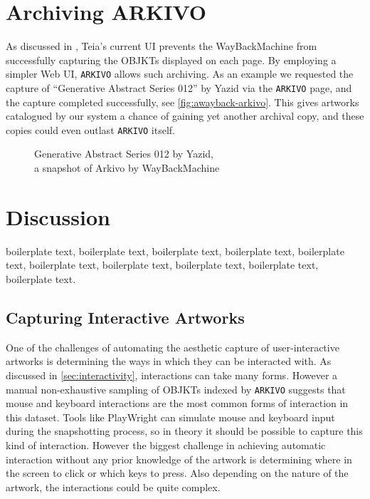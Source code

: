 \todo


\section{Archiving ARKIVO}

As discussed in \todo, Teia's current UI prevents the WayBackMachine from successfully capturing the OBJKTs displayed on each page. By employing a simpler Web UI, \texttt{ARKIVO} allows such archiving. As an example we requested the capture of ``Generative Abstract Series 012'' by Yazid via the \texttt{ARKIVO} page, and the capture completed successfully, see \autoref{fig:awayback-arkivo}. This gives artworks catalogued by our system a chance of gaining yet another archival copy, and these copies could even outlast \texttt{ARKIVO} itself.


\begin{figure}[h]
    \centering
    \captionsetup{justification=centering}
    \begingroup
    \setlength{\fboxsep}{0pt} %
    \setlength{\fboxrule}{1pt} %
    \endgroup
    \caption[WayBackMachine snapshots Arkivo]{Generative Abstract Series 012 by Yazid, \\ a snapshot of Arkivo by WayBackMachine}
    \label{fig:awayback-arkivo}
\end{figure}


\section{Discussion}


boilerplate text, boilerplate text, boilerplate text, boilerplate text, boilerplate text, boilerplate text, boilerplate text, boilerplate text, boilerplate text, boilerplate text.


\subsection{Capturing Interactive Artworks}
\label{subsec:capture-interactive}

One of the challenges of automating the aesthetic capture of user-interactive artworks is determining the ways in which they can be interacted with. As discussed in \autoref{sec:interactivity}, interactions can take many forms. However a manual non-exhaustive sampling of OBJKTs indexed by \texttt{ARKIVO} suggests that mouse and keyboard interactions are the most common forms of interaction in this dataset. Tools like PlayWright can simulate mouse and keyboard input during the snapshotting process, so in theory it should be possible to capture this kind of interaction. However the biggest challenge in achieving automatic interaction without any prior knowledge of the artwork is determining where in the screen to click or which keys to press. Also depending on the nature of the artwork, the interactions could be quite complex.

